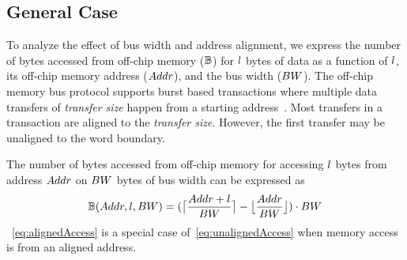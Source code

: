 \subsection{General Case}
To analyze the effect of bus width and address alignment, we express the number of bytes accessed from off-chip memory ($\numBytesOffChip$) for $\dataLength$ bytes of data as a function of $\dataLength$, its off-chip memory address ($\addressSym$), and the bus width ($\busWidth$).
The off-chip memory bus protocol supports burst based transactions where multiple data transfers of \emph{transfer size} happen from a starting address~\cite{AxiProtocolSpec}. Most transfers in a transaction are aligned to the \emph{transfer size}. However, the first transfer may be unaligned to the word boundary. 

The number of bytes accessed from off-chip memory for accessing $\dataLength$ bytes from address $\addressSym$ on $\busWidth$ bytes of bus width can be expressed as
\begin{equation}\label{eq:unalignedAccess}
	\begin{aligned}
		\numBytesOffChip(\addressSym,\dataLength,\busWidth)=(\ceil[\big]{\frac{\addressSym+\dataLength}{\busWidth}}-\floor[\big]{\frac{\addressSym}{\busWidth}})\cdot{\busWidth}
	\end{aligned}
\end{equation}
~\eqref{eq:alignedAccess} is a special case of~\eqref{eq:unalignedAccess} when memory access is from an aligned address.
